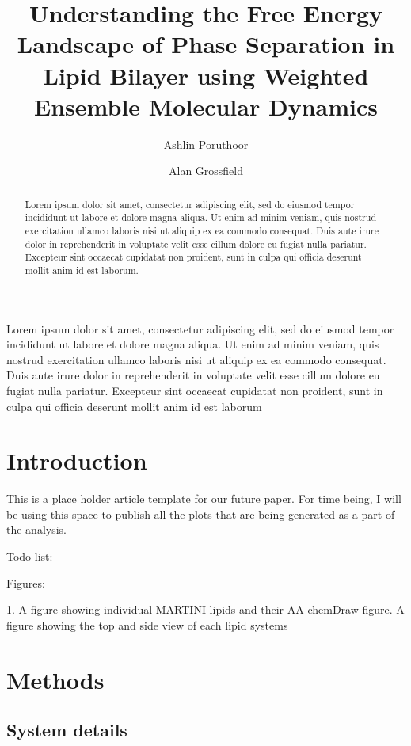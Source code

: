 \documentclass{biophys-new}
\title{Understanding the Free Energy Landscape of Phase Separation in Lipid Bilayer using Weighted Ensemble Molecular Dynamics}
\author[1]{Ashlin Poruthoor}
\author[1,*]{Alan Grossfield}
\affil[1]{University of Rochester Medical Center, Rochester, NY 14620}
\begin{document}
\begin{frontmatter}
\begin{abstract}

Lorem ipsum dolor sit amet, consectetur adipiscing elit, sed do eiusmod tempor incididunt ut labore et dolore magna aliqua. Ut enim ad minim veniam, quis nostrud exercitation ullamco laboris nisi ut aliquip ex ea commodo consequat. Duis aute irure dolor in reprehenderit in voluptate velit esse cillum dolore eu fugiat nulla pariatur. Excepteur sint occaecat cupidatat non proident, sunt in culpa qui officia deserunt mollit anim id est laborum.

\end{abstract}

\begin{sigstatement}

Lorem ipsum dolor sit amet, consectetur adipiscing elit, sed do eiusmod tempor incididunt ut labore et dolore magna aliqua. Ut enim ad minim veniam, quis nostrud exercitation ullamco laboris nisi ut aliquip ex ea commodo consequat. Duis aute irure dolor in reprehenderit in voluptate velit esse cillum dolore eu fugiat nulla pariatur. Excepteur sint occaecat cupidatat non proident, sunt in culpa qui officia deserunt mollit anim id est laborum

\end{sigstatement}

\end{frontmatter}

\section*{Introduction}

This is a place holder article template for our future paper. For time being, I will be using this 
space to publish all the plots that are being generated as a part of the analysis.

Todo list:

Figures: 

1. A figure showing individual MARTINI lipids and their AA chemDraw figure.
    A figure showing the top and side view of each lipid systems

\section*{Methods}

\subsection*{System details}
\end{document}
